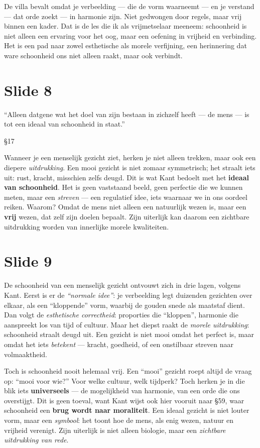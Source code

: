 \documentclass{article}
\begin{document}
De villa bevalt omdat je verbeelding --- die de vorm waarneemt --- en je verstand --- dat orde zoekt --- in harmonie zijn. Niet gedwongen door regels, maar vrij binnen een kader. Dat is de les die ik als vrijmetselaar meeneem: schoonheid is niet alleen een ervaring voor het oog, maar een oefening in vrijheid en verbinding. Het is een pad naar zowel esthetische als morele verfijning, een herinnering dat ware schoonheid ons niet alleen raakt, maar ook verbindt.

\section*{Slide 8}

\epigraph{``Alleen datgene wat het doel van zijn bestaan in zichzelf heeft — de mens — is tot een ideaal van schoonheid in staat.''}{§17}

Wanneer je een menselijk gezicht ziet, herken je niet alleen trekken, maar ook een diepere \textit{uitdrukking}. Een mooi gezicht is niet zomaar symmetrisch; het straalt iets uit: rust, kracht, misschien zelfs deugd. Dit is wat Kant bedoelt met het \textbf{ideaal van schoonheid}. Het is geen vaststaand beeld, geen perfectie die we kunnen meten, maar een \textit{streven} --- een regulatief idee, iets waarnaar we in ons oordeel reiken. Waarom? Omdat de mens niet alleen een natuurlijk wezen is, maar een \textbf{vrij} wezen, dat zelf zijn doelen bepaalt. Zijn uiterlijk kan daarom een zichtbare uitdrukking worden van innerlijke morele kwaliteiten.

\section*{Slide 9}

De schoonheid van een menselijk gezicht ontvouwt zich in drie lagen, volgens Kant. Eerst is er de \textit{``normale idee''}: je verbeelding legt duizenden gezichten over elkaar, als een ``kloppende'' vorm, waarbij de gouden snede als maatstaf dient. Dan volgt de \textit{esthetische correctheid}: proporties die ``kloppen'', harmonie die aanspreekt los van tijd of cultuur. Maar het diepst raakt de \textit{morele uitdrukking}: schoonheid straalt deugd uit. Een gezicht is niet mooi omdat het perfect is, maar omdat het iets \textit{betekent} --- kracht, goedheid, of een onstilbaar streven naar volmaaktheid.

Toch is schoonheid nooit helemaal vrij. Een ``mooi'' gezicht roept altijd de vraag op: ``mooi voor wie?'' Voor welke cultuur, welk tijdperk? Toch herken je in die blik iets \textbf{universeels} --- de mogelijkheid van harmonie, van een orde die ons overstijgt. Dit is geen toeval, want Kant wijst ook hier vooruit naar §59, waar schoonheid een \textbf{brug wordt naar moraliteit}. Een ideaal gezicht is niet louter vorm, maar een \textit{symbool}: het toont hoe de mens, als enig wezen, natuur en vrijheid verenigt. Zijn uiterlijk is niet alleen biologie, maar een \textit{zichtbare uitdrukking van rede}.
\end{document}
